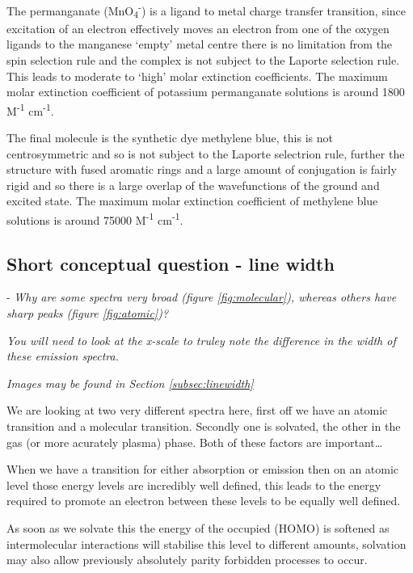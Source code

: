 \documentclass[
]{book}
\begin{document}
The permanganate (MnO\textsubscript{4}\textsuperscript{-}) is a ligand to metal charge transfer transition, since excitation of an electron effectively moves an electron from one of the oxygen ligands to the manganese `empty' metal centre there is no limitation from the spin selection rule and the complex is not subject to the Laporte selection rule. This leads to moderate to `high' molar extinction coefficients. The maximum molar extinction coefficient of potassium permanganate solutions is around 1800 M\textsuperscript{-1} cm\textsuperscript{-1}.

The final molecule is the synthetic dye methylene blue, this is not centrosymmetric and so is not subject to the Laporte selectrion rule, further the structure with fused aromatic rings and a large amount of conjugation is fairly rigid and so there is a large overlap of the wavefunctions of the ground and excited state. The maximum molar extinction coefficient of methylene blue solutions is around 75000 M\textsuperscript{-1} cm\textsuperscript{-1}.

\hypertarget{subsec:linewidthans}{%
\subsection{Short conceptual question - line width}\label{subsec:linewidthans}}

- \emph{Why are some spectra very broad (figure \ref{fig:molecular}), whereas others have sharp peaks (figure \ref{fig:atomic})?}

\emph{You will need to look at the x-scale to truley note the difference in the width of these emission spectra.}

\emph{Images may be found in Section \ref{subsec:linewidth}}

We are looking at two very different spectra here, first off we have an atomic transition and a molecular transition. Secondly one is solvated, the other in the gas (or more acurately plasma) phase. Both of these factors are important\ldots{}

When we have a transition for either absorption or emission then on an atomic level those energy levels are incredibly well defined, this leads to the energy required to promote an electron between these levels to be equally well defined.

As soon as we solvate this the energy of the occupied (HOMO) is softened as intermolecular interactions will stabilise this level to different amounts, solvation may also allow previously absolutely parity forbidden processes to occur.
\end{document}
